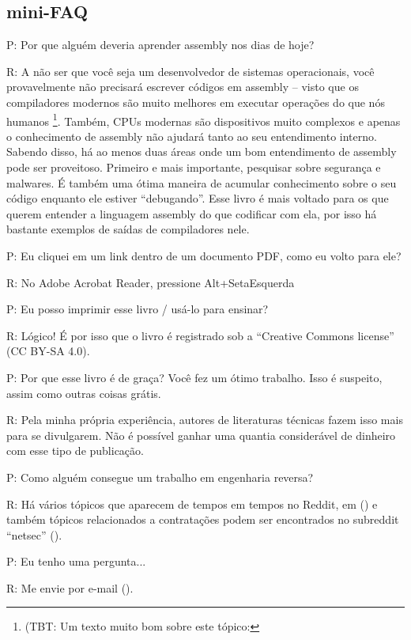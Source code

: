 \subsection*{mini-FAQ}


\par P: Por que alguém deveria aprender assembly nos dias de hoje?
\par R: A não ser que você seja um desenvolvedor de sistemas operacionais, você provavelmente não precisará escrever códigos em assembly – visto que os compiladores modernos são muito melhores em executar operações 
do que nós humanos
\footnote{(\ac{TBT}: Um texto muito bom sobre este tópico: \InSqBrackets{\AgnerFog}}.
Também, \ac{CPU}s modernas são dispositivos muito complexos e apenas o conhecimento de assembly não ajudará tanto ao seu entendimento interno. Sabendo disso, há ao menos duas áreas onde um bom entendimento de assembly pode ser proveitoso. Primeiro e mais importante, pesquisar sobre segurança e malwares. É também uma ótima maneira de acumular conhecimento sobre o seu código enquanto ele estiver “debugando”. Esse livro é mais voltado para os que querem entender a linguagem assembly do que codificar com ela, por isso há bastante exemplos de saídas de compiladores nele.

\par P: Eu cliquei em um link dentro de um documento PDF, como eu volto para ele?
\par R: No Adobe Acrobat Reader, pressione Alt+SetaEsquerda

\par P: Eu posso imprimir esse livro / usá-lo para ensinar?
\par R: Lógico! É por isso que o livro é registrado sob a “Creative Commons license” (CC BY-SA 4.0).

\par P: Por que esse livro é de graça? Você fez um ótimo trabalho. Isso é suspeito, assim como outras coisas grátis.
\par R: Pela minha própria experiência, autores de literaturas técnicas fazem isso mais para se divulgarem. Não é possível ganhar uma quantia considerável de dinheiro com esse tipo de publicação.

\par P: Como alguém consegue um trabalho em engenharia reversa?
\par R: Há vários tópicos que aparecem de tempos em tempos no Reddit\FNURLREDDIT{}, em (\RedditHiringThread{})
e também tópicos relacionados a contratações podem ser encontrados no subreddit ``netsec'' (\NetsecHiringThread{}).


\par P: Eu tenho uma pergunta...
\par R: Me envie por e-mail (\EMAIL).

